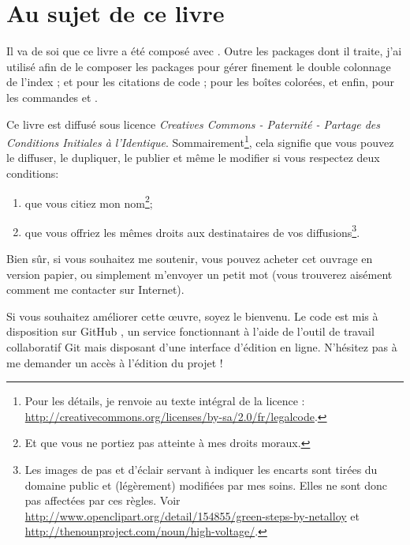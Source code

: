 \section*{Au sujet de ce livre}

Il va de soi que ce livre a été composé avec \XeLaTeX. Outre les packages dont il traite, j'ai utilisé afin de le composer les packages  pour gérer finement le double colonnage de l'index ;  et  pour les citations de code ;  pour les boîtes colorées, et enfin,  pour les commandes \XeLaTeX et \XeTeX.



Ce livre est diffusé sous licence \emph{Creatives Commons - Paternité - Partage des Conditions Initiales à l'Identique}. Sommairement\footnote{Pour les détails, je renvoie au texte intégral de la licence : \url{http://creativecommons.org/licenses/by-sa/2.0/fr/legalcode}.}, cela signifie que vous pouvez le diffuser, le dupliquer, le publier et même le modifier si vous respectez deux conditions:
\begin{enumerate}
\item que vous citiez mon nom\footnote{Et que vous ne portiez  pas atteinte à mes droits moraux.};
\item que vous offriez les mêmes droits aux destinataires de vos diffusions\footnote{Les images de pas et d'éclair servant à indiquer les encarts sont tirées du domaine public et (légèrement) modifiées par mes soins. Elles ne sont donc pas affectées par ces règles. Voir \url{http://www.openclipart.org/detail/154855/green-steps-by-netalloy} et \url{http://thenounproject.com/noun/high-voltage/}.}.
\end{enumerate}

Bien sûr, si vous souhaitez me soutenir, vous pouvez acheter cet ouvrage en version papier, ou simplement m'envoyer un petit mot (vous trouverez aisément comment me contacter sur Internet).

Si vous souhaitez améliorer cette œuvre, soyez le bienvenu. Le code est mis à disposition sur GitHub \url{}, un service fonctionnant à l'aide de l'outil de travail collaboratif Git mais disposant d'une interface d'édition en ligne. N'hésitez pas à me demander un accès à l'édition du projet ! 

